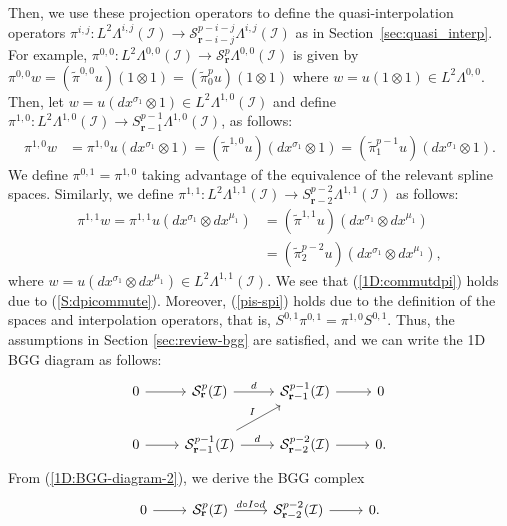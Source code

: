 \documentclass[final]{amsart}%
\newcommand{\0}{\mathaccent23}
\newcommand{\br}{\mathbf r}
\begin{document}
Then, we use these projection operators to define the quasi-interpolation operators $\pi^{i,j}: L^{2}\Lambda^{i, j}(\mathcal{I})\to \mathcal{S}_{\br-i-j}^{p-i-j}\Lambda^{i, j}(\mathcal{I})$ as in Section~\ref{sec:quasi_interp}.
For example, $\pi^{0,0}: L^2\Lambda^{0, 0}(\mathcal{I})\to \mathcal{S}_{\br}^{p}\Lambda^{0, 0}(\mathcal{I})$ is given by $\pi^{0,0} w=(\tilde{\pi}^{0,0}u) (1\otimes 1)=(\tilde{\pi}_{0}^p u)(1\otimes 1)$ where $w=u(1\otimes 1)\in L^2\Lambda^{0, 0}$. 
Then, let $w=u ( dx^{\sigma_1} \otimes 1)\in L^2\Lambda^{1,0}(\mathcal{I})$ and define $\pi^{1,0}: L^2\Lambda^{1,0}(\mathcal{I})\to S_{\br-1}^{p-1}\Lambda^{1,0}(\mathcal{I})$, as follows:
 \begin{align*}
     \pi^{1,0} w&=\pi^{1,0}u (dx^{\sigma_1}\otimes 1)=(\tilde{\pi}^{1,0} u) (dx^{\sigma_1}\otimes 1)=(\tilde{\pi}_1^{p-1} u) (dx^{\sigma_1}\otimes 1).
 \end{align*}
 We define $\pi^{0,1}=  \pi^{1,0}$ taking advantage of the equivalence of the relevant spline spaces. Similarly, we define $\pi^{1,1}:L^2\Lambda^{1,1} (\mathcal{I})\to S_{\br-2}^{p-2}\Lambda^{1,1}(\mathcal{I})$ as follows: 
 \begin{align*}
     \pi^{1,1} w=\pi^{1,1}u (dx^{\sigma_1}\otimes dx^{\mu_1})&=(\tilde{\pi}^{1,1}u )(dx^{\sigma_1}\otimes dx^{\mu_1})\\&=(\tilde{\pi}_{2}^{p-2} u) (dx^{\sigma_1}\otimes dx^{\mu_1}),
 \end{align*}
 where $w=u(dx^{\sigma_1}\otimes dx^{\mu_1})\in L^2\Lambda^{1,1}(\mathcal{I})$.
 We see that (\ref{1D:commutdpi}) holds due to (\ref{S:dpicommute}).
 Moreover, (\ref{pis-spi}) holds due to the definition of the spaces and interpolation operators, that is, $S^{0,1}\pi^{0,1}=\pi^{1,0}S^{0,1}$.
Thus, the assumptions in Section \ref{sec:review-bgg} are satisfied, and
we can write the 1D BGG diagram as follows:
 \begin{equation}\label{1D:BGG-diagram-2}
\begin{tikzcd}
0 \arrow{r} &\mathcal{S}_{\br}^{p} (\mathcal{I}) \arrow{r}{d} &\mathcal{S}_{\br-1}^{p-1} (\mathcal{I})\arrow{r}{} & 0\\
0 \arrow{r} &\mathcal{S}_{\br-1}^{p-1}(\mathcal{I})\arrow{r}{d} \arrow[ur, "I"]&\mathcal{S}_{\br-2}^{p-2}(\mathcal{I}) \arrow{r}&0.
 \end{tikzcd}
\end{equation}
From (\ref{1D:BGG-diagram-2}), we derive the BGG complex
\begin{equation*}
\begin{tikzcd}
0 \arrow{r}&\mathcal{S}_{\br}^{p}(\mathcal{I}) \arrow{r}{d\circ I \circ d}&\mathcal{S}_{\br-2}^{p-2}(\mathcal{I})\arrow{r}&0.
\end{tikzcd}
\end{equation*} 
\end{document}
